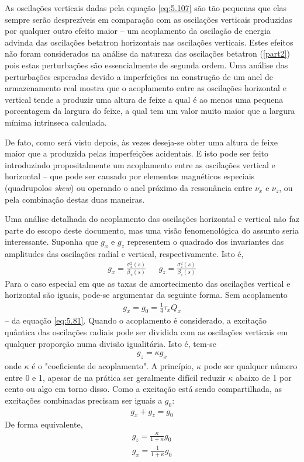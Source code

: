 As oscilações verticais dadas pela equação \eqref{eq:5.107} são tão pequenas que elas sempre serão desprezíveis em comparação com as oscilações verticais produzidas por qualquer outro efeito maior -- um acoplamento da oscilação de energia advinda das oscilações betatron horizontais nas oscilações verticais. Estes efeitos não foram considerados na análise da natureza das oscilações betatron (\autoref{part2}) pois estas perturbações são essencialmente de segunda ordem. Uma análise das perturbações esperadas devido a imperfeições na construção de um anel de armazenamento real mostra que o acoplamento entre as oscilações horizontal e vertical tende a produzir uma altura de feixe a qual é ao menos uma pequena porcentagem da largura do feixe, a qual tem um valor muito maior que a largura mínima intrínseca calculada.

De fato, como será visto depois, às vezes deseja-se obter uma altura de feixe maior que a produzida pelas imperfeições acidentais. E isto pode ser feito introduzindo propositalmente um acoplamento entre as oscilações vertical e horizontal -- que pode ser causado por elementos magnéticos especiais (quadrupolos \textit{skew}) ou operando o anel próximo da ressonância entre $\nu_x$ e $\nu_z$, ou pela combinação destas duas maneiras.

Uma análise detalhada do acoplamento das oscilações horizontal e vertical não faz parte do escopo deste documento, mas uma visão fenomenológica do assunto seria interessante. Suponha que $g_x$ e $g_z$ representem o quadrado dos invariantes das amplitudes das oscilações radial e vertical, respectivamente. Isto é,
\begin{align}
	g_x = \frac{\sigma_x^2(s)}{\beta_x(s)}\ \ \ \ \ \ \ g_z = \frac{\sigma_z^2(s)}{\beta_z(s)}\label{eq:5.109}
\end{align}
Para o caso especial em que as taxas de amortecimento das oscilações vertical e horizontal são iguais, pode-se argumentar da seguinte forma. Sem acoplamento
\begin{align}
	g_x = g_0 = \frac{1}{4} \tau_x Q_x
\end{align}
-- da equação \eqref{eq:5.81}. Quando o acoplamento é considerado, a excitação quântica das oscilações radiais pode ser dividida com as oscilações verticais em qualquer proporção numa divisão igualitária. Isto é, tem-se
\begin{align}
	g_z = \kappa g_x
\end{align}
onde $\kappa$ é o "coeficiente de acoplamento". A princípio, $\kappa$ pode ser qualquer número entre 0 e 1, apesar de na prática ser geralmente difícil reduzir $\kappa$ abaixo de 1 por cento ou algo em torno disso. Como a excitação está sendo compartilhada, as excitações combinadas precisam ser iguais a $g_0$:
\begin{align}
	g_x + g_z = g_0
\end{align}
De forma equivalente,
\begin{align}
	g_z = \frac{\kappa}{1+\kappa}g_0 \nonumber \\
	g_x = \frac{1}{1+\kappa}g_0
\end{align}

